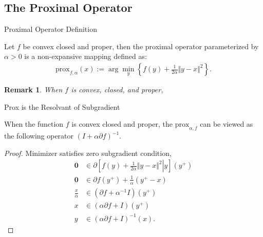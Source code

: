 \documentclass[11pt]{beamer}
\newtheorem{remark}{Remark}
\begin{document}
    \subsection{The Proximal Operator}
        \begin{frame}{Proximal Operator Definition}
            \begin{definition}
                Let $f$ be convex closed and proper, then the proximal operator parameterized by $\alpha > 0$ is a non-expansive mapping defined as: 
                \begin{align*}
                    \text{prox}_{f, \alpha}(x) := 
                    \arg\min_{y}\left\lbrace
                        f(y) + \frac{1}{2\alpha} \Vert y - x\Vert^2
                    \right\rbrace. 
                \end{align*}
            \end{definition}  
            \begin{remark}
                When $f$ is convex, closed, and proper, 
            \end{remark}
        \end{frame}
        \begin{frame}{Prox is the Resolvant of Subgradient}
            \begin{lemma}\label{lemma:prox_alternative_form}
                When the function $f$ is convex closed and proper, the $\text{prox}_{\alpha, f}$ can be viewed as the following operator $(I + \alpha \partial f)^{-1}$. 
            \end{lemma}
            \begin{proof}
                Minimizer satisfies zero subgradient condition, 
                {\scriptsize
                \begin{align*}
                    \mathbf 0 &\in \partial
                    \left[
                        \left.
                            f(y) + \frac{1}{2\alpha} \Vert y - x\Vert^2 
                        \right| y
                    \right](y^+)
                    \\
                    \mathbf 0 &\in \partial f(y^+) + \frac{1}{\alpha}(y^+ - x)
                    \\
                    \frac{x}{\alpha} &\in 
                    (\partial f + \alpha^{-1}I)(y^+)
                    \\
                    x &\in 
                    (\alpha \partial f + I)(y^+)
                    \\
                    y &\in (\alpha\partial f+ I)^{-1}(x).
                \end{align*}
                }
            \end{proof}
                
        \end{frame}
\end{document}

